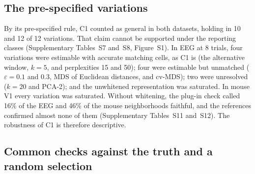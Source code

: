 \documentclass[11pt]{article}
\newcommand{\EegCells}{10}
\newcommand{\MouseCells}{12}
\newcommand{\EegUnwhitenedNF}{16}
\newcommand{\MouseUnwhitenedNF}{46}
\begin{document}
\subsection{The pre-specified variations}\label{sec:res-rob}

By its pre-specified rule, C1 counted as general in both datasets, holding in \EegCells{} and \MouseCells{} of 12 variations.
That claim cannot be supported under the reporting classes (Supplementary Tables~S7 and~S8, Figure~S1).
In EEG at 8 trials, four variations were estimable with accurate matching cells, as C1 is (the alternative window, $k=5$, and perplexities 15 and 50); four were estimable but unmatched ($\varepsilon=0.1$ and $0.3$, MDS of Euclidean distances, and cv-MDS); two were unresolved ($k=20$ and PCA-2); and the unwhitened representation was saturated.
In mouse V1 every variation was saturated.
Without whitening, the plug-in check called \EegUnwhitenedNF\% of the EEG and \MouseUnwhitenedNF\% of the mouse neighborhoods faithful, and the references confirmed almost none of them (Supplementary Tables~S11 and~S12).
The robustness of C1 is therefore descriptive.

\subsection{Common checks against the truth and a random selection}\label{sec:res-checks}
\end{document}
